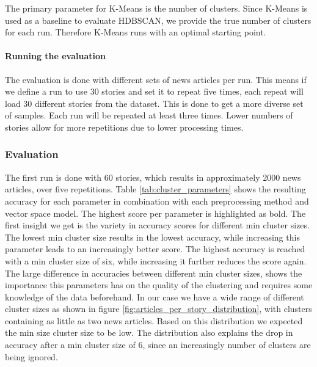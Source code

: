 The primary parameter for K-Means is the number of clusters. Since K-Means is used as a baseline to evaluate HDBSCAN, we provide the true number of clusters for each run. Therefore K-Means runs with an optimal starting point. 

\paragraph{Running the evaluation} The evaluation is done with different sets of news articles per run. This means if we define a run to use 30 stories and set it to repeat five times, each repeat will load 30 different stories from the dataset. This is done to get a more diverse set of samples. Each run will be repeated at least three times. Lower numbers of stories allow for more repetitions due to lower processing times.   

\subsubsection{Evaluation}

The first run is done with 60 stories, which results in approximately 2000 news articles, over five repetitions. Table \ref{tab:cluster_parameters} shows the resulting accuracy for each parameter in combination with each preprocessing method and vector space model. The highest score per parameter is highlighted as bold. The first insight we get is the variety in accuracy scores for different min cluster sizes. The lowest min cluster size results in the lowest accuracy, while increasing this parameter leads to an increasingly better score. The highest accuracy is reached with a min cluster size of six, while increasing it further reduces the score again. The large difference in accuracies between different min cluster sizes, shows the importance this parameters has on the quality of the clustering and requires some knowledge of the data beforehand. In our case we have a wide range of different cluster sizes as shown in figure \ref{fig:articles_per_story_distribution}, with clusters containing as little as two news articles. Based on this distribution we expected the min size cluster size to be low. The distribution also explains the drop in accuracy after a min cluster size of 6, since an increasingly number of clusters are being ignored.

